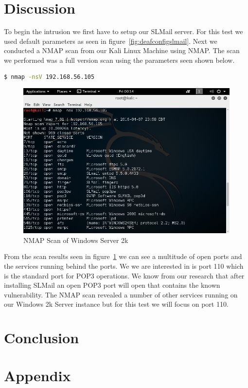 \documentclass[12pt]{article}
\begin{document}
\section{Discussion}
\label{sect:discussion}
To begin the intrusion we first have to setup our SLMail server. For this
test we used default parameters as seen in figure~\ref{fig:deafconfigslmail}.
Next we conducted a NMAP scan from our Kali Linux Machine using NMAP. The
scan we performed was a full version scan using the parameters seen shown 
below.

\begin{lstlisting}[language=bash]
    $ nmap -nsV 192.168.56.105
\end{lstlisting}

\begin{figure}[ht]
    \centering
    \includegraphics[width=5.5in]{images/20160407_nmap_scan.png}
    \caption{NMAP Scan of Windows Server 2k}
    \label{fig:nmapwindows}
\end{figure}

From the scan results seen in figure~\ref{fig:nmapwindows} we can see a
multitude of open ports and the services running behind the ports. We we are
interested in is port 110 which is the standard port for POP3 operations. We
know from our research that after installing SLMail an open POP3 port will
open that contains the known vulnerability. The NMAP scan revealed a number
of other services running on our Windows 2k Server instance but for this test
we will focus on port 110. 


\section{Conclusion}
\label{sect:conclusion}


\nocite{*}



\section*{Appendix}
\label{sect:appendix}
\end{document}
